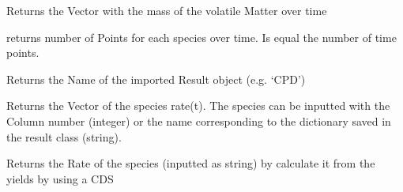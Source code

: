 \documentclass[letterpaper,10pt,english]{sphinxmanual}
\begin{document}
\begin{fulllineitems}
\begin{fulllineitems}
\end{fulllineitems}


\begin{fulllineitems}
\label{FittingClasses:Fit_one_run.Fit_one_run.MassVM_s}
Returns the Vector with the mass of the volatile Matter over time

\end{fulllineitems}


\begin{fulllineitems}
\label{FittingClasses:Fit_one_run.Fit_one_run.NPoints}
returns number of Points for each species over time. Is equal the number of time points.

\end{fulllineitems}


\begin{fulllineitems}
\label{FittingClasses:Fit_one_run.Fit_one_run.Name}
Returns the Name of the imported Result object (e.g. `CPD')

\end{fulllineitems}


\begin{fulllineitems}
\label{FittingClasses:Fit_one_run.Fit_one_run.Rate}
Returns the Vector of the species rate(t). The species can be inputted with the Column number (integer) or the name corresponding to the dictionary saved in the result class (string).

\end{fulllineitems}


\begin{fulllineitems}
\label{FittingClasses:Fit_one_run.Fit_one_run.RateSingleSpec}
Returns the Rate of the species (inputted as string) by calculate it from the yields by using a CDS


\end{fulllineitems}
\end{fulllineitems}
\end{document}
